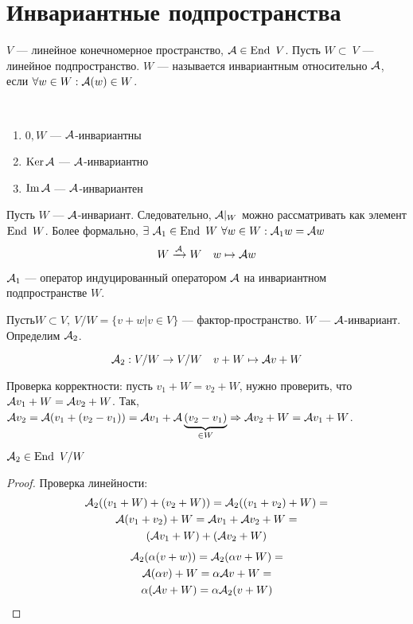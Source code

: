 \documentclass[main]{subfiles}
\begin{document}
\chapter{Инвариантные подпространства}

\begin{definition} 
    $V$ — линейное конечномерное пространство, $\mathcal{A}\in \operatorname{End} \ V$. Пусть $W\subset \ V$ — линейное подпространство.
    $W$ — называется инвариантным относительно $\mathcal{A}$, если $\forall w\in W : \mathcal{A}(w) \in W$.
\end{definition}

\begin{propertylist}
    \
    \begin{enumerate}
        \item $0, W$ — $\mathcal{A}$-инвариантны
        \item $\operatorname{Ker} \mathcal{A}$ — $\mathcal{A}$-инвариантно
        \item $\operatorname{Im} \mathcal{A}$ — $\mathcal{A}$-инвариантен
    \end{enumerate}
\end{propertylist}



Пусть $W$ — $\mathcal{A}$-инвариант. Следовательно, $\mathcal{A}|_W$ можно рассматривать как элемент $\operatorname{End} \ W$.
Более формально, $\exists\  \mathcal{A}_1 \in \operatorname{End} \ W \ \forall w \in W : \mathcal{A}_1 w=\mathcal{A} w$
\[W\xrightarrow{\mathcal{A}} W \quad w\mapsto \mathcal{A} w\]

$\mathcal{A}_1$  —  оператор индуцированный оператором $\mathcal{A}$ на инвариантном подпространстве $W$.

$Пусть W\subset V,\ V/W = \{ v+w |v \in V\}$ — фактор-пространство.  $W$ — $\mathcal{A}$-инвариант.
Определим $\mathcal{A}_2$.

\[\mathcal{A}_2: V/W \rightarrow V/W \quad v+W \mapsto \mathcal{A} v+W\]

Проверка корректности: пусть $v_1+W = v_2+W$, нужно проверить, что $\mathcal{A} v_1+W=\mathcal{A} v_2 + W$. Так, $\mathcal{A} v_2= \mathcal{A}(v_1+(v_2-v_1))=\mathcal{A} v_1+ \mathcal{A}\underbrace{(v_2-v_1)}_{\in W} \Rightarrow
    \mathcal{A} v_2 + W= \mathcal{A} v_1+W$.

\begin{proposition} {}
    $\mathcal{A}_2 \in \operatorname{End} \ V/W$
\end{proposition}

\begin{proof}
    Проверка линейности:
    \begin{multline*}
        \mathcal{A}_2((v_1+W)+(v_2+W))= \mathcal{A}_2((v_1+v_2)+W)=\\
        \mathcal{A}(v_1+v_2)+W=  \mathcal{A} v_1+\mathcal{A} v_2+W=\\
        (\mathcal{A} v_1+W)+(\mathcal{A} v_2+W)
    \end{multline*}
    \begin{multline*}
        \mathcal{A}_2(\alpha(v+w))= \mathcal{A}_2(\alpha v+W)=\\
        \mathcal{A}(\alpha v)+W= \alpha \mathcal{A} v +W=\\
        \alpha(\mathcal{A} v +W) = \alpha \mathcal{A}_2(v+W)
    \end{multline*}
\end{proof}
\end{document}
